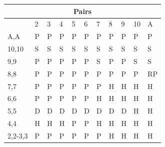 \documentclass[conference]{IEEEtran}
\begin{document}
\begin{table}[ht]
\begin{tabular}{|l|l|l|l|l|l|l|l|l|l|l|}
\multicolumn{11}{|c|}{\textbf{Pairs}}                                 \\ \hline
                             & 2 & 3 & 4 & 5 & 6 & 7 & 8 & 9 & 10 & A \\ \hline
A,A                          & \cellcolor{yellow!75}P & \cellcolor{yellow!75}P & \cellcolor{yellow!75}P & \cellcolor{yellow!75}P & \cellcolor{yellow!75}P & \cellcolor{yellow!75}P & \cellcolor{yellow!75}P & \cellcolor{yellow!75}P & \cellcolor{yellow!75}P & \cellcolor{yellow!75}P  \\ \hline
10,10                        & \cellcolor{red!75}S & \cellcolor{red!75}S & \cellcolor{red!75}S & \cellcolor{red!75}S & \cellcolor{red!75}S & \cellcolor{red!75}S & \cellcolor{red!75}S & \cellcolor{red!75}S & \cellcolor{red!75}S & \cellcolor{red!75}S  \\ \hline
9,9                          & \cellcolor{yellow!75}P & \cellcolor{yellow!75}P & \cellcolor{yellow!75}P & \cellcolor{yellow!75}P & \cellcolor{yellow!75}P & \cellcolor{red!75}S & \cellcolor{yellow!75}\cellcolor{yellow!75}P & \cellcolor{yellow!75}P & \cellcolor{red!75}S & \cellcolor{red!75}S  \\ \hline
8,8                          & \cellcolor{yellow!75}P & \cellcolor{yellow!75}P & \cellcolor{yellow!75}P & \cellcolor{yellow!75}P & \cellcolor{yellow!75}P & \cellcolor{yellow!75}P & \cellcolor{yellow!75}P & \cellcolor{yellow!75}P & \cellcolor{yellow!75}P & \cellcolor{magenta!80}RP  \\ \hline
7,7                          & \cellcolor{yellow!75}P & \cellcolor{yellow!75}P & \cellcolor{yellow!75}P & \cellcolor{yellow!75}P & \cellcolor{yellow!75}P & \cellcolor{yellow!75}P & \cellcolor{green!50}H & \cellcolor{green!50}H & \cellcolor{green!50}H & \cellcolor{green!50}H  \\ \hline
6,6                           & \cellcolor{yellow!75}P & \cellcolor{yellow!75}P & \cellcolor{yellow!75}P & \cellcolor{yellow!75}P & \cellcolor{yellow!75}P & \cellcolor{green!50}H & \cellcolor{green!50}H & \cellcolor{green!50}H & \cellcolor{green!50}H & \cellcolor{green!50}H  \\ \hline
5,5                          & \cellcolor{blue!25}D & \cellcolor{blue!25}D & \cellcolor{blue!25}D & \cellcolor{blue!25}D & \cellcolor{blue!25}D & \cellcolor{blue!25}D & \cellcolor{blue!25}D & \cellcolor{blue!25}D & \cellcolor{green!50}H & \cellcolor{green!50}H  \\ \hline
4,4                          & \cellcolor{green!50}H & \cellcolor{green!50}H & \cellcolor{green!50}H & \cellcolor{yellow!75}P & \cellcolor{yellow!75}P & \cellcolor{green!50}H & \cellcolor{green!50}H & \cellcolor{green!50}H & \cellcolor{green!50}H & \cellcolor{green!50}H  \\ \hline
2,2-3,3                      & \cellcolor{yellow!75}P & \cellcolor{yellow!75}P & \cellcolor{yellow!75}P & \cellcolor{yellow!75}P & \cellcolor{yellow!75}P & \cellcolor{yellow!75}P & \cellcolor{green!50}H & \cellcolor{green!50}H & \cellcolor{green!50}H & \cellcolor{green!50}H  \\ \hline
\end{tabular}
\end{table}
\end{document}
